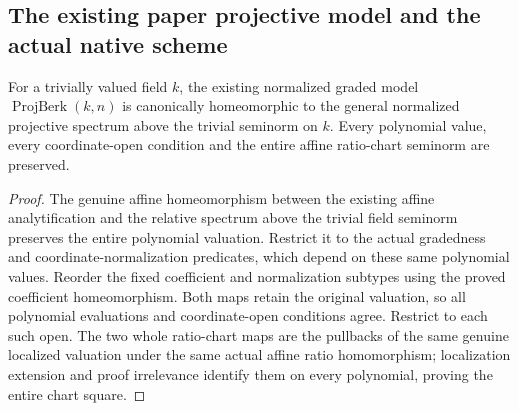 \subsection{The existing paper projective model and the actual native scheme}
\label{subsec:native-projective-paper-bridge}

\begin{theorem}
\label{projective:paper-normalized-spectrum-bridge}
\leanok
{}
For a trivially valued field $k$, the existing normalized graded model
$\operatorname{ProjBerk}(k,n)$ is canonically homeomorphic to the general
normalized projective spectrum above the trivial seminorm on $k$.
Every polynomial value, every coordinate-open condition and the entire
affine ratio-chart seminorm are preserved.
\end{theorem}
\begin{proof}
The genuine affine homeomorphism between the existing affine
analytification and the relative spectrum above the trivial field
seminorm preserves the entire polynomial valuation. Restrict it to the
actual gradedness and coordinate-normalization predicates, which depend
on these same polynomial values. Reorder the fixed coefficient and
normalization subtypes using the proved coefficient homeomorphism.
Both maps retain the original valuation, so all polynomial evaluations
and coordinate-open conditions agree. Restrict to each such open.
The two whole ratio-chart maps are the pullbacks of the same genuine
localized valuation under the same actual affine ratio homomorphism;
localization extension and proof irrelevance identify them on every
polynomial, proving the entire chart square.
\end{proof}

